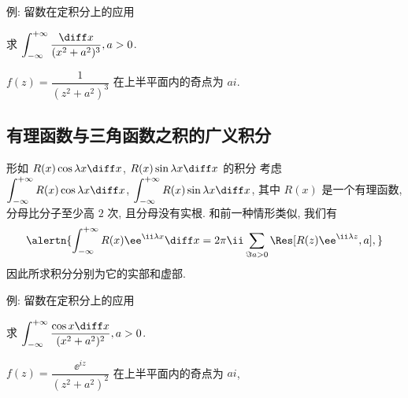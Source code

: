 \begin{frame}{例: 留数在定积分上的应用\noexer}
	\onslide<+->
	\begin{example}
		求 $\displaystyle\int_{-\infty}^{+\infty}\frac{\diff x}{(x^2+a^2)^3},a>0$.
	\end{example}

	\onslide<+->
	\begin{solution}
		$f(z)=\dfrac1{(z^2+a^2)^3}$ 在上半平面内的奇点为 $ai$.
		\vspace{-\baselineskip}
		\onslide<+->{故
			\[\int_{-\infty}^{+\infty}\frac{\diff x}{(x^2+a^2)^3}
		=2\pi\ii\Res[f(z),ai]=\frac{3\pi}{8a^5}.
	\]
		}
		\vspace{-.5\baselineskip}
	\end{solution}
\end{frame}


\subsection{有理函数与三角函数之积的广义积分}

\begin{frame}{形如 $R(x)\cos{\lambda x}\diff x$,
	$R(x)\sin{\lambda x}\diff x$ 的积分\noexer}
	\onslide<+->
	考虑 $\displaystyle\int_{-\infty}^{+\infty}R(x)\cos{\lambda x}\diff x$,
	$\displaystyle\int_{-\infty}^{+\infty}R(x)\sin{\lambda x}\diff x$, 其中 $R(x)$ 是一个有理函数, 分母比分子至少高 $2$ 次, 且分母没有实根.
	\onslide<+->
	和前一种情形类似, 我们有
	\[\alertn{\int_{-\infty}^{+\infty}R(x)\ee^{\ii\lambda x}\diff x
	=2\pi\ii\sum_{\Im a>0}\Res[R(z)\ee^{\ii\lambda z},a],}
	\]
	\onslide<+->
	因此所求积分分别为它的实部和虚部.
\end{frame}


\begin{frame}{例: 留数在定积分上的应用\noexer}
	\beqskip{2pt}
	\onslide<+->
	\begin{example}
		求 $\displaystyle\int_{-\infty}^{+\infty}\frac{\cos x\diff x}{(x^2+a^2)^2}, a>0$.
	\end{example}

	\onslide<+->
	\begin{solution}
		$f(z)=\dfrac{\ee^{iz}}{(z^2+a^2)^2}$ 在上半平面内的奇点为 $ai$,
		\onslide<+->{
			\[\Res[f(z),ai]=\lim_{z\to ai}\left[\frac{\ee^{iz}}{(z+ai)^2}\right]'=-\frac{\ee^{-a}(a+1)\ii}{4a^3}.
	\]
		}\onslide<+->{
			\[\int_{-\infty}^{+\infty}\frac{\cos x\diff x}{(x^2+a^2)^2}=\frac{\pi \ee^{-a}(a+1)}{2a^3}.
	\]
		}
	\end{solution}
	\endgroup
\end{frame}



